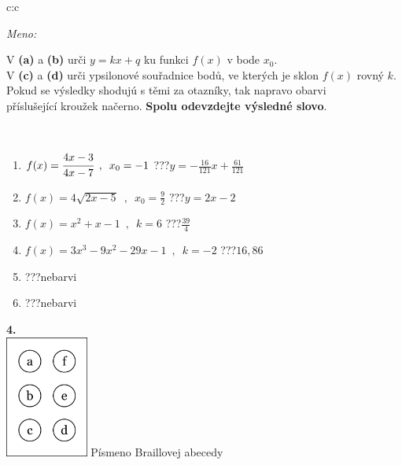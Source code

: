\documentclass[10pt]{report}
\begin{document}
\begin{tabular}{c:c}
\begin{minipage}[c][104.5mm][t]{0.5\linewidth}
\begin{center}
\textit{Meno:}\phantom{xxxxxxxxxxxxxxxxxxxxxxxxxxxxxxxxxxxxxxxxxxxxxxxxxxxxxxxxxxxxxxxxx}\\[5mm]
\begin{minipage}{0.95\linewidth}
\begin{center}
V \textbf{(a)} a \textbf{(b)} urči  $y = kx + q$ ku funkci $f(x)$ v bode $x_0$.\\V \textbf{(c)} a \textbf{(d)} urči ypsilonové souřadnice bodů, ve kterých je sklon $f(x)$ rovný $k$.\\Pokud se výsledky shodujú s těmi za otazníky, tak napravo obarvi\\příslušející kroužek načerno. \textbf{Spolu odevzdejte výsledné slovo}.
\end{center}
\end{minipage}
\\[1mm]
\begin{minipage}{0.79\linewidth}
\begin{center}
\begin{varwidth}{\linewidth}
\begin{enumerate}
\small
\item $f(x)=\cfrac{4x-3}{4x-7}\enspace , \enspace x_0=-1$\quad \dotfill\; ???\;\dotfill \quad $y = -\frac{16}{121}x+\frac{61}{121}$
\item $f(x)=4\sqrt{2x-5}\enspace , \enspace x_0=\frac{9}{2}$\quad \dotfill\; ???\;\dotfill \quad $y = 2x-2$
\item $f(x)=x^2+x-1\enspace , \enspace k=6$\quad \dotfill\; ???\;\dotfill \quad $\frac{39}{4}$
\item $f(x)=3x^3-9x^2-29x-1\enspace , \enspace k=-2$\quad \dotfill\; ???\;\dotfill \quad $16 , 86$
\item \quad \dotfill\; ???\;\dotfill \quad nebarvi
\item \quad \dotfill\; ???\;\dotfill \quad nebarvi
\end{enumerate}
\end{varwidth}
\end{center}
\end{minipage}
\begin{minipage}{0.20\linewidth}
\begin{center}
{\Huge\bfseries 4.} \\[2mm]
\includegraphics[height=40mm]{../images/braille.png}
{\small Písmeno Braillovej abecedy}
\end{center}
\end{minipage}
\end{center}
\end{minipage}
%
\end{tabular}
\end{document}
